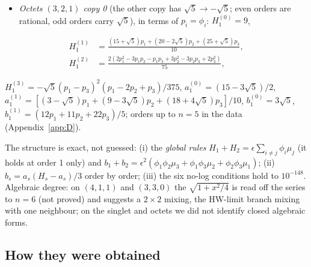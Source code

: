 \documentclass[11pt]{article}
\begin{document}
\begin{itemize}
\item \emph{Octets $(3,2,1)$ copy 0} (the other copy has $\sqrt5\to-\sqrt5$; even orders are rational, odd orders carry $\sqrt5$), in terms of $p_i=\phi_i$: $H_1^{(0)}=9$,
\end{itemize}

\begin{equation}
\begin{aligned}
H_1^{(1)}&=\frac{(15+\sqrt5)p_1+(20-2\sqrt5)p_2+(25+\sqrt5)p_3}{10},\\
H_1^{(2)}&=\frac{2(2p_1^2-3p_1p_2-p_1p_3+3p_2^2-3p_2p_3+2p_3^2)}{75},
\end{aligned}
\end{equation}

$H_1^{(3)}=-\sqrt5(p_1-p_3)^2(p_1-2p_2+p_3)/375$, $a_1^{(0)}=(15-3\sqrt5)/2$, $a_1^{(1)}=[(3-\sqrt5)p_1+(9-3\sqrt5)p_2+(18+4\sqrt5)p_3]/10$, $b_1^{(0)}=3\sqrt5$, $b_1^{(1)}=(12p_1+11p_2+22p_3)/5$; orders up to $n=5$ in the data (Appendix~\ref{app:D}).

The structure is exact, not guessed: (i) the \emph{global rules} $H_1+H_2=\epsilon\sum_{i\ne j}\phi_i\mu_j$ (it holds at order 1 only) and $b_1+b_2=\epsilon^2(\phi_1\phi_2\mu_3+\phi_1\phi_3\mu_2+\phi_2\phi_3\mu_1)$; (ii) $b_s=a_s(H_s-a_s)/3$ order by order; (iii) the six no-log conditions hold to $10^{-148}$. Algebraic degree: on $(4,1,1)$ and $(3,3,0)$ the $\sqrt{1+x^2/4}$ is read off the series to $n=6$ (not proved) and suggests a $2\times2$ mixing, the HW-limit branch mixing with one neighbour; on the singlet and octets we did not identify closed algebraic forms.

\subsection{How they were obtained}\label{sec:seriesmethod}
\end{document}
